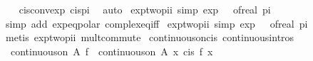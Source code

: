 \begin{isabellebody}
%
\isadelimproof
\ \ %
\endisadelimproof
%
\isatagproof
{}\isamarkupfalse%
\ cis{\isacharunderscore}{\kern0pt}conv{\isacharunderscore}{\kern0pt}exp\ cis{\isacharunderscore}{\kern0pt}pi\ \isamarkupfalse%
\ auto%
\endisatagproof
{\isafoldproof}%
%
\isadelimproof
\isanewline
%
\endisadelimproof
\isanewline
{}\isamarkupfalse%
\ exp{\isacharunderscore}{\kern0pt}two{\isacharunderscore}{\kern0pt}pi{\isacharunderscore}{\kern0pt}i\ {\isacharbrackleft}{\kern0pt}simp{\isacharbrackright}{\kern0pt}{\isacharcolon}{\kern0pt}\ {\isachardoublequoteopen}exp\ {\isacharparenleft}{\kern0pt}{}\ {\isacharasterisk}{\kern0pt}\ of{\isacharunderscore}{\kern0pt}real\ pi\ {\isacharasterisk}{\kern0pt}\ {\isasymi}{\isacharparenright}{\kern0pt}\ {\isacharequal}{\kern0pt}\ {}{\isachardoublequoteclose}\isanewline
%
\isadelimproof
\ \ %
\endisadelimproof
%
\isatagproof
{}\isamarkupfalse%
\ {\isacharparenleft}{\kern0pt}simp\ add{\isacharcolon}{\kern0pt}\ exp{\isacharunderscore}{\kern0pt}eq{\isacharunderscore}{\kern0pt}polar\ complex{\isacharunderscore}{\kern0pt}eq{\isacharunderscore}{\kern0pt}iff{\isacharparenright}{\kern0pt}%
\endisatagproof
{\isafoldproof}%
%
\isadelimproof
\isanewline
%
\endisadelimproof
\isanewline
{}\isamarkupfalse%
\ exp{\isacharunderscore}{\kern0pt}two{\isacharunderscore}{\kern0pt}pi{\isacharunderscore}{\kern0pt}i{\isacharprime}{\kern0pt}\ {\isacharbrackleft}{\kern0pt}simp{\isacharbrackright}{\kern0pt}{\isacharcolon}{\kern0pt}\ {\isachardoublequoteopen}exp\ {\isacharparenleft}{\kern0pt}{\isasymi}\ {\isacharasterisk}{\kern0pt}\ {\isacharparenleft}{\kern0pt}of{\isacharunderscore}{\kern0pt}real\ pi\ {\isacharasterisk}{\kern0pt}\ {}{\isacharparenright}{\kern0pt}{\isacharparenright}{\kern0pt}\ {\isacharequal}{\kern0pt}\ {}{\isachardoublequoteclose}\isanewline
%
\isadelimproof
\ \ %
\endisadelimproof
%
\isatagproof
{}\isamarkupfalse%
\ {\isacharparenleft}{\kern0pt}metis\ exp{\isacharunderscore}{\kern0pt}two{\isacharunderscore}{\kern0pt}pi{\isacharunderscore}{\kern0pt}i\ mult{\isachardot}{\kern0pt}commute{\isacharparenright}{\kern0pt}%
\endisatagproof
{\isafoldproof}%
%
\isadelimproof
\isanewline
%
\endisadelimproof
\isanewline
{}\isamarkupfalse%
\ continuous{\isacharunderscore}{\kern0pt}on{\isacharunderscore}{\kern0pt}cis\ {\isacharbrackleft}{\kern0pt}continuous{\isacharunderscore}{\kern0pt}intros{\isacharbrackright}{\kern0pt}{\isacharcolon}{\kern0pt}\isanewline
\ \ {\isachardoublequoteopen}continuous{\isacharunderscore}{\kern0pt}on\ A\ f\ {\isasymLongrightarrow}\ continuous{\isacharunderscore}{\kern0pt}on\ A\ {\isacharparenleft}{\kern0pt}{\isasymlambda}x{\isachardot}{\kern0pt}\ cis\ {\isacharparenleft}{\kern0pt}f\ x{\isacharparenright}{\kern0pt}{\isacharparenright}{\kern0pt}{\isachardoublequoteclose}\isanewline

\end{isabellebody}

